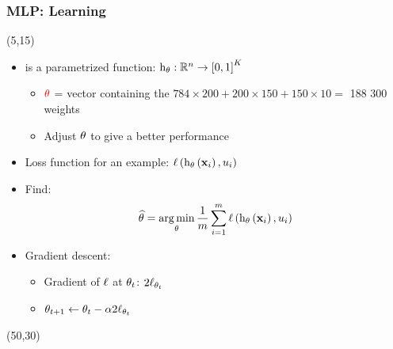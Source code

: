 \begin{frame}
  \frametitle{\acl{MLP}: Learning}

  \begin{textblock}{45}(5,15)
    \begin{itemize}
    \item {} is a parametrized function: $\mathrm{h}_{\mathbf{\theta}} :
      \mathbb{R}^{n} \rightarrow \left [ {0}, {1} \right ]^{K}$
      \begin{itemize}
      \item ${\color{red}\mathbf{\theta}}$ = vector containing the {\tiny $784 \times
          200 + 200 \times 150 + 150 \times 10 = $} 188 300 weights
      \item Adjust $\mathbf{\theta}$ to give a better performance
      \end{itemize}
      \item<2-> Loss function for an example:
        $\apply{\lossFunc}{%
          \apply{\decisionFunc_{\params}}{%
            \example_i
          },
          \knownLabel_i
        }$
      \item<2-> Find:
        \[
          \widehat{\mathbf{\theta}} = \operatorname*{arg\,min}_{\mathbf{\theta}}{
            \frac{1}{m} \sum_{i=1}^{m}
            \mathrm{\ell} \left ( {
              \mathrm{h}_{\mathbf{\theta}} \left ( {\mathbf{x}_i} \right ),
              u_i
            } \right )
          }
        \]
      \item<3-> Gradient descent:
        \begin{itemize}
        \item Gradient of $\mathrm{\ell}$ at $\mathbf{\theta}_{t}$: $2\mathrm{\ell}_{\mathbf{\theta}_{t}}$
        \item $\mathbf{\theta}_{t+1} \leftarrow \mathbf{\theta}_{t} - \alpha 2\mathrm{\ell}_{\mathbf{\theta}_{t}}$
        \end{itemize}
      \end{itemize}
  \end{textblock}
  \begin{textblock}{50}(50,30)
    \begin{center}
\end{center}
\end{textblock}
\end{frame}
